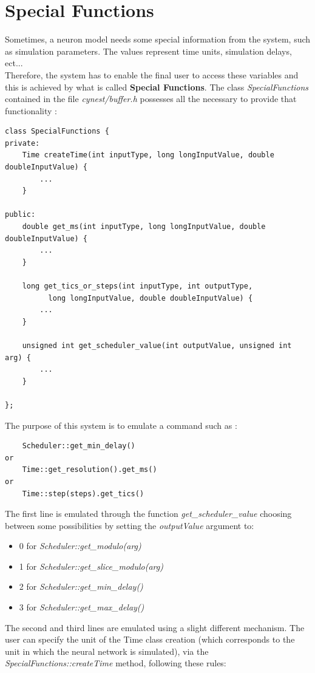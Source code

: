 \documentclass{article}
\begin{document}
\section{Special Functions}
Sometimes, a neuron model needs some special information from the system, such as simulation parameters. The values represent time units, simulation delays, ect...\\
Therefore, the system has to enable the final user to access these variables and this is achieved by what is called \textbf{Special Functions}. The class \emph{SpecialFunctions} contained in the file \emph{cynest/buffer.h} possesses all the necessary to provide that functionality :
\begin{verbatim}
class SpecialFunctions {
private:
    Time createTime(int inputType, long longInputValue, double doubleInputValue) {
        ...
    }

public:
    double get_ms(int inputType, long longInputValue, double doubleInputValue) {
        ...
    }

    long get_tics_or_steps(int inputType, int outputType, 
          long longInputValue, double doubleInputValue) {
        ...
    }

    unsigned int get_scheduler_value(int outputValue, unsigned int arg) {
        ...
    }

};
\end{verbatim}
The purpose of this system is to emulate a command such as :
\begin{verbatim}
    Scheduler::get_min_delay()
or
    Time::get_resolution().get_ms()
or
    Time::step(steps).get_tics()
\end{verbatim}
The first line is emulated through the function \emph{get\_scheduler\_value} choosing between some possibilities by setting the \emph{outputValue} argument to:
\begin{itemize}
\item 0 for \emph{Scheduler::get\_modulo(arg)}
\item 1 for \emph{Scheduler::get\_slice\_modulo(arg)}
\item 2 for \emph{Scheduler::get\_min\_delay()}
\item 3 for \emph{Scheduler::get\_max\_delay()}
\end{itemize}
The second and third lines are emulated using a slight different mechanism. The user can specify the unit of the Time class creation (which corresponds to the unit in which the neural network is simulated), via the \emph{SpecialFunctions::createTime} method, following these rules:
\end{document}
